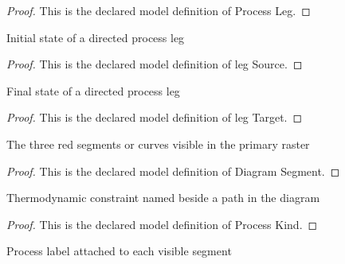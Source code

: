 \begin{proof}
  This is the declared model definition of Process Leg.
\end{proof}
\begin{definition}
  \label{def:physics:phyx-mini-0491:phyxminiproblems-problemphyxmini0491-legsource}
  Initial state of a directed process leg
\end{definition}
\begin{proof}
  This is the declared model definition of leg Source.
\end{proof}
\begin{definition}
  \label{def:physics:phyx-mini-0491:phyxminiproblems-problemphyxmini0491-legtarget}
  Final state of a directed process leg
\end{definition}
\begin{proof}
  This is the declared model definition of leg Target.
\end{proof}
\begin{definition}
  \label{def:physics:phyx-mini-0491:phyxminiproblems-problemphyxmini0491-diagramsegment}
  The three red segments or curves visible in the primary raster
\end{definition}
\begin{proof}
  This is the declared model definition of Diagram Segment.
\end{proof}
\begin{definition}
  \label{def:physics:phyx-mini-0491:phyxminiproblems-problemphyxmini0491-processkind}
  Thermodynamic constraint named beside a path in the diagram
\end{definition}
\begin{proof}
  This is the declared model definition of Process Kind.
\end{proof}
\begin{definition}
  \label{def:physics:phyx-mini-0491:phyxminiproblems-problemphyxmini0491-displayedprocesskind}
  Process label attached to each visible segment
\end{definition}
